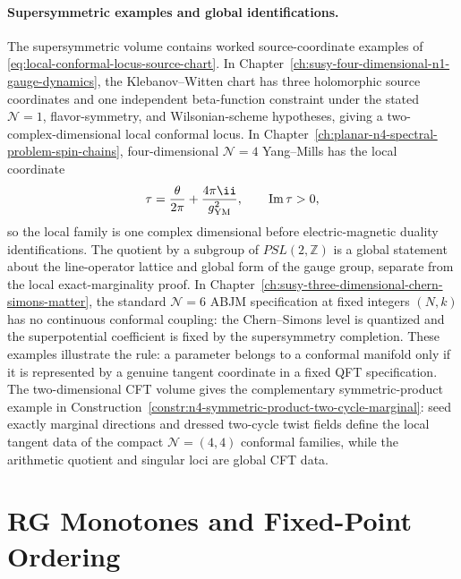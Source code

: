 \paragraph{Supersymmetric examples and global identifications.}
The supersymmetric volume contains worked source-coordinate examples of
\eqref{eq:local-conformal-locus-source-chart}.  In
Chapter~\ref{ch:susy-four-dimensional-n1-gauge-dynamics}, the
Klebanov--Witten chart has three holomorphic source coordinates and one
independent beta-function constraint under the stated
\(\mathcal N=1\), flavor-symmetry, and Wilsonian-scheme hypotheses, giving a
two-complex-dimensional local conformal locus.  In
Chapter~\ref{ch:planar-n4-spectral-problem-spin-chains}, four-dimensional
\(\mathcal N=4\) Yang--Mills has the local coordinate
\[
  \tau=\frac{\theta}{2\pi}+\frac{4\pi\ii}{g_{\rm YM}^2},
  \qquad \operatorname{Im}\tau>0,
\]
so the local family is one complex dimensional before electric-magnetic
duality identifications.  The quotient by a subgroup of \(PSL(2,\mathbb Z)\)
is a global statement about the line-operator lattice and global form of the
gauge group, separate from the local exact-marginality proof.  In
Chapter~\ref{ch:susy-three-dimensional-chern-simons-matter}, the standard
\(\mathcal N=6\) ABJM specification at fixed integers \((N,k)\) has no
continuous conformal coupling: the Chern--Simons level is quantized and the
superpotential coefficient is fixed by the supersymmetry completion.  These
examples illustrate the rule: a parameter belongs to a conformal manifold only
if it is represented by a genuine tangent coordinate in a fixed QFT
specification.
The two-dimensional CFT volume gives the complementary symmetric-product
example in
Construction~\ref{constr:n4-symmetric-product-two-cycle-marginal}: seed
exactly marginal directions and dressed two-cycle twist fields define the
local tangent data of the compact \(\mathcal N=(4,4)\) conformal families,
while the arithmetic quotient and singular loci are global CFT data.

\section{RG Monotones and Fixed-Point Ordering}
\label{sec:rg-monotones-fixed-point-ordering}

